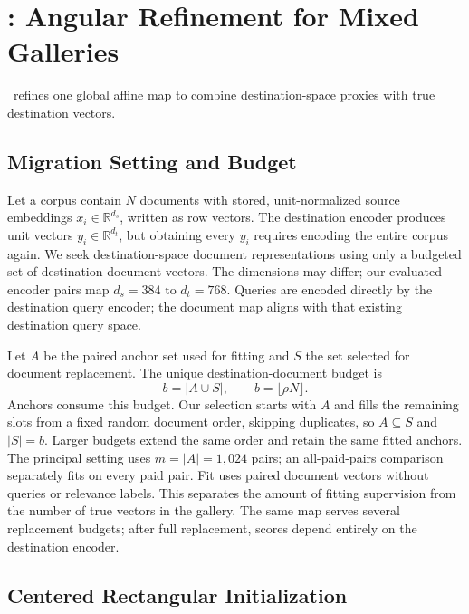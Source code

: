 \section{\method: Angular Refinement for Mixed Galleries}
\label{sec:method}

\method\ refines one global affine map to combine destination-space proxies
with true destination vectors.

\subsection{Migration Setting and Budget}
\label{sec:setting}

Let a corpus contain $N$ documents with stored, unit-normalized source embeddings
$x_i\in\mathbb{R}^{d_s}$, written as row vectors. The destination encoder produces
unit vectors $y_i\in\mathbb{R}^{d_t}$, but obtaining every $y_i$ requires encoding
the entire corpus again. We seek destination-space document representations
using only a budgeted set of destination document vectors. The dimensions may
differ; our evaluated encoder pairs map $d_s=384$ to $d_t=768$. Queries are encoded
directly by the destination query encoder; the document map aligns with that
existing destination query space.

Let $A$ be the paired anchor set used for fitting and $S$ the set selected for
document replacement. The unique destination-document budget is
\begin{equation}
 b=|A\cup S|,\qquad b=\lfloor\rho N\rfloor .
 \label{eq:budget}
\end{equation}
Anchors consume this budget. Our selection starts with $A$ and fills the
remaining slots from a fixed random document order, skipping duplicates, so
$A\subseteq S$ and $|S|=b$. Larger budgets extend the same order and retain the
same fitted anchors. The principal setting uses $m=|A|=1{,}024$ pairs; an
all-paid-pairs comparison separately fits on every paid pair. Fit uses paired
document vectors without queries or relevance labels. This separates the
amount of fitting supervision from the number of true vectors in the gallery.
The same map serves several replacement budgets; after full replacement,
scores depend entirely on the destination encoder.

\subsection{Centered Rectangular Initialization}
\label{sec:initialization}

